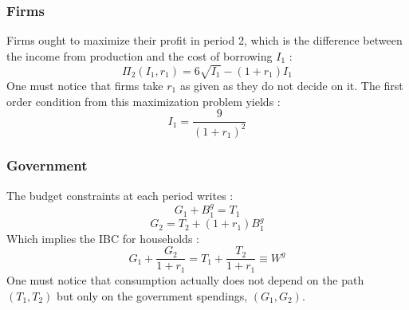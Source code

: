 \documentclass{article}
\begin{document}
\subsubsection*{Firms}
Firms ought to maximize their profit in period 2, which is the difference between the income from production and the cost of borrowing $I_1$ : 
\begin{equation}
    \Pi_2(I_1, r_1)  = 6\sqrt{I_1} - (1+r_1) I_1
\end{equation}
One must notice that firms take $r_1$ as given as they do not decide on it.\newline
The first order condition from this maximization problem yields :
\begin{equation}
    I_1  = \frac{9}{(1+r_1)^2}
\end{equation}
\subsubsection*{Government}
The budget constraints at each period writes :
\begin{equation}
    G_1 + B_1^g = T_1
\end{equation}
\begin{equation}
    G_2  = T_2 + (1+r_1) B_1^g
\end{equation}
Which implies the IBC for households :
\begin{equation}
    G_1 + \frac{G_2}{1+r_1}  = T_1 + \frac{T_2}{1+r_1} \equiv W^g
\end{equation}
One must notice that consumption actually does not depend on the path $(T_1, T_2)$ but only on the government spendings, $(G_1, G_2)$.
\end{document}
